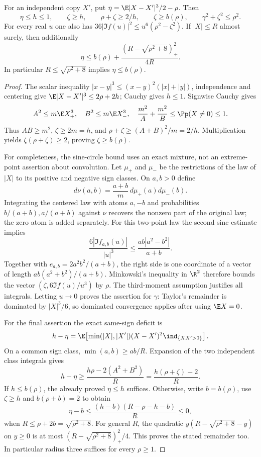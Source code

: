 \begin{lemma}\label{j:fourier:surrogate}
For an independent copy $X'$, put
$\eta=\E|X-X'|^3/2-\rho$. Then
\[
 \eta\le h\le1,\qquad \zeta\ge h,\qquad
 \rho+\zeta\ge2/h,\qquad \zeta\ge b(\rho),
 \qquad \gamma^2+\zeta^2\le\rho^2.
\]
For every real $u$ one also has
$36|\Im f(u)|^2\le u^6(\rho^2-\zeta^2)$.
If $|X|\le R$ almost surely, then additionally
\[
 \eta\le b(\rho)+\frac{(R-\sqrt{\rho^2+8})_+^2}{4R}.
\]
In particular $R\le\sqrt{\rho^2+8}$ implies $\eta\le b(\rho)$.
\end{lemma}
\begin{proof}
The scalar inequality
$|x-y|^3\le(x-y)^2(|x|+|y|)$, independence and centering give
$\E|X-X'|^3\le2\rho+2h$; Cauchy gives $h\le1$.
Signwise Cauchy gives
\[
 A^2\le m\E X_+^3,\quad B^2\le m\E X_-^3,
 \quad \frac{m^2}{A}+\frac{m^2}{B}\le\Pp(X\ne0)\le1.
\]
Thus $AB\ge m^2$, $\zeta\ge2m=h$, and
$\rho+\zeta\ge(A+B)^2/m=2/h$. Multiplication yields
$\zeta(\rho+\zeta)\ge2$, proving $\zeta\ge b(\rho)$.

For completeness, the sine-circle bound uses an exact mixture, not an
extreme-point assertion about convolution. Let $\mu_+$ and $\mu_-$ be the
restrictions of the law of $|X|$ to its positive and negative sign classes.
On $a,b>0$ define
\[
 d\nu(a,b)=\frac{a+b}{m}\,d\mu_+(a)d\mu_-(b).
\]
Integrating the centered law with atoms $a,-b$ and probabilities
$b/(a+b),a/(a+b)$ against $\nu$ recovers the nonzero part of the original
law; the zero atom is added separately. For this two-point law the second
sinc estimate implies
\[
 \frac{6|\Im f_{a,b}(u)|}{|u|^3}
 \le\frac{ab|a^2-b^2|}{a+b}.
\]
Together with $e_{a,b}=2a^2b^2/(a+b)$, the right side is one coordinate
of a vector of length $ab(a^2+b^2)/(a+b)$. Minkowski's inequality in
$\R^2$ therefore bounds the vector
$(\zeta,6\Im f(u)/u^3)$ by $\rho$. The third-moment assumption
justifies all integrals. Letting $u\to0$ proves the assertion for $\gamma$:
Taylor's remainder is dominated by $|X|^3/6$, so dominated convergence
applies after using $\E X=0$.

For the final assertion the exact same-sign deficit is
\[
 h-\eta=\E\!\left[
 \min(|X|,|X'|)(X-X')^2\ind_{\{XX'>0\}}\right].
\]
On a common sign class, $\min(a,b)\ge ab/R$. Expansion of the two
independent class integrals gives
\[
 h-\eta\ge\frac{h\rho-2(A^2+B^2)}{R}
 =\frac{h(\rho+\zeta)-2}{R}.
\]
If $h\le b(\rho)$, the already proved $\eta\le h$ suffices. Otherwise,
write $b=b(\rho)$, use $\zeta\ge h$ and $b(\rho+b)=2$ to obtain
\[
 \eta-b\le\frac{(h-b)(R-\rho-h-b)}{R}\le0,
\]
when $R\le\rho+2b=\sqrt{\rho^2+8}$. For general $R$, the quadratic
$y(R-\sqrt{\rho^2+8}-y)$ on $y\ge0$ is at most
$(R-\sqrt{\rho^2+8})_+^2/4$. This proves the stated remainder too.
In particular radius three suffices for every $\rho\ge1$.
\end{proof}

